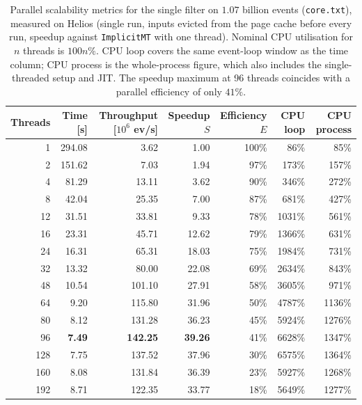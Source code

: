 \begin{table}[htbp]
\centering
\caption{Parallel scalability metrics for the single filter on $1.07$ billion events (\texttt{core.txt}), measured on Helios (single run, inputs evicted from the page cache before every run, speedup against \texttt{ImplicitMT} with one thread). Nominal CPU utilisation for $n$ threads is $100n\%$. CPU loop covers the same event-loop window as the time column; CPU process is the whole-process figure, which also includes the single-threaded setup and JIT. The speedup maximum at 96 threads coincides with a parallel efficiency of only $41\%$.}
\label{tab:scalability-filter}
\begin{tabular}{rrrrrrr}
\toprule
Threads & Time [s] & Throughput [$10^6$ ev/s] & Speedup $S$ & Efficiency $E$ & CPU loop & CPU process \\
\midrule
 1 & 294.08 & 3.62 & 1.00 & 100\% & 86\% & 85\% \\
 2 & 151.62 & 7.03 & 1.94 & 97\% & 173\% & 157\% \\
 4 & 81.29 & 13.11 & 3.62 & 90\% & 346\% & 272\% \\
 8 & 42.04 & 25.35 & 7.00 & 87\% & 681\% & 427\% \\
12 & 31.51 & 33.81 & 9.33 & 78\% & 1031\% & 561\% \\
16 & 23.31 & 45.71 & 12.62 & 79\% & 1366\% & 631\% \\
24 & 16.31 & 65.31 & 18.03 & 75\% & 1984\% & 731\% \\
32 & 13.32 & 80.00 & 22.08 & 69\% & 2634\% & 843\% \\
48 & 10.54 & 101.10 & 27.91 & 58\% & 3605\% & 971\% \\
64 & 9.20 & 115.80 & 31.96 & 50\% & 4787\% & 1136\% \\
80 & 8.12 & 131.28 & 36.23 & 45\% & 5924\% & 1276\% \\
96 & \textbf{7.49} & \textbf{142.25} & \textbf{39.26} & 41\% & 6628\% & 1347\% \\
128 & 7.75 & 137.52 & 37.96 & 30\% & 6575\% & 1364\% \\
160 & 8.08 & 131.84 & 36.39 & 23\% & 5927\% & 1268\% \\
192 & 8.71 & 122.35 & 33.77 & 18\% & 5649\% & 1277\% \\
\bottomrule
\end{tabular}
\end{table}
